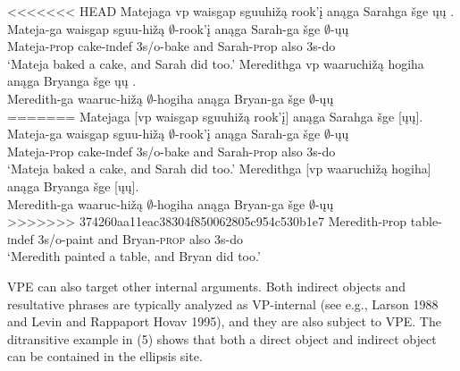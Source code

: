 \documentclass[output=paper]{LSP/langsci}
\begin{document}
\begin{exe}
\ex
\begin{xlist}
\ex
<<<<<<< HEAD
\glll Matejaga {\ob}{vp} {waisgap sguuhižą} rook'į{\cb} anąga Sarahga šge {\ob}ųų{\cb} .\\
Mateja-ga {} {waisgap sguu-hižą} $\emptyset$-rook'į anąga Sarah-ga šge $\emptyset$-ųų\\
Mateja-{\textsc prop} {} cake-{\textsc indef} {\textsc 3s/o}-bake and Sarah-{\textsc prop} also {\textsc 3s}-do\\
\trans `Mateja baked a cake, and Sarah did too.'
\ex
\glll Meredithga {\ob}{vp} waaruchižą hogiha{\cb} anąga Bryanga šge {\ob}ųų{\cb} .\\
Meredith-ga {} waaruc-hižą $\emptyset$-hogiha anąga Bryan-ga šge $\emptyset$-ųų\\
=======
\glll Matejaga {\textsc [vp} {waisgap sguuhi\v{z}\k{a}} rook'\k{i}{\textsc ]} an\k{a}ga Sarahga \v{s}ge {\textsc [}\k{u}\k{u}{\textsc ]}.\\
Mateja-ga {} {waisgap sguu-hi\v{z}\k{a}} $\emptyset$-rook'\k{i} an\k{a}ga Sarah-ga \v{s}ge $\emptyset$-\k{u}\k{u}\\
Mateja-{\textsc prop} {} cake-{\textsc indef} {\textsc 3s/o}-bake and Sarah-{\textsc prop} also {\textsc 3s}-do\\
\trans `Mateja baked a cake, and Sarah did too.'
\ex
\glll Meredithga {\textsc [vp} waaruchi\v{z}\k{a} hogiha{\textsc ]} an\k{a}ga Bryanga \v{s}ge {\textsc [}\k{u}\k{u}{\textsc ]}.\\
Meredith-ga {} waaruc-hi\v{z}\k{a} $\emptyset$-hogiha an\k{a}ga Bryan-ga \v{s}ge $\emptyset$-\k{u}\k{u}\\
>>>>>>> 374260aa11eac38304f850062805c954c530b1e7
Meredith-{\textsc prop} {} table-{\textsc indef} {\textsc 3s/o}-paint and Bryan-\textsc{prop} also {\textsc 3s}-do\\
\trans `Meredith painted a table, and Bryan did too.'
\end{xlist}
\end{exe}

VPE can also target other internal arguments. Both indirect objects and resultative phrases are typically analyzed as VP-internal (see e.g., Larson 1988 and Levin and Rappaport Hovav 1995), and they are also subject to VPE. The ditransitive example in (5) shows that both a direct object and indirect object can be contained in the ellipsis site.
\end{document}
